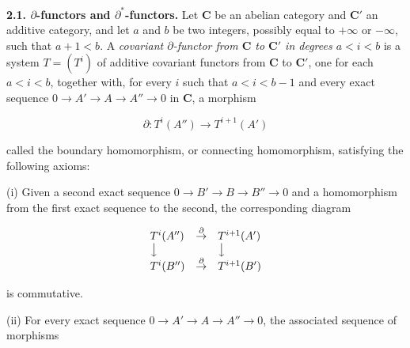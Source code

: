 \textbf{2.1. $\partial$-functors and
$\partial^*$-functors.}
Let $\mathbf{C}$ be an abelian category and $\mathbf{C}'$ an additive category, and let $a$ and
$b$ be two integers, possibly equal to $+\infty$ or $-\infty$, such that
$a+1<b$. A \textit{covariant $\partial$-functor from $\mathbf{C}$ to $\mathbf{C}'$ in degrees
$a<i<b$} is a system $T=(T^i)$ of additive covariant functors from $\mathbf{C}$ to
$\mathbf{C}'$, one for each $a<i<b$, together with, for every $i$ such that
$a<i<b-1$ and every exact sequence
$0\to A'\to A\to A''\to 0$
in $\mathbf{C}$, a morphism

\[
 \partial:T^i(A'')\to T^{i+1}(A')
\]

\noindent called the boundary homomorphism, or connecting homomorphism,
satisfying the following axioms:

 (i) Given a second exact sequence
$0\to B'\to B\to B''\to 0$
and a homomorphism from the first exact sequence to the second, the
corresponding diagram

\[
\begin{array}{lcl}
T^i(A'') & \mathop{\to}\limits^{\partial} & T^{i+1}(A')\\
\big\downarrow && \big\downarrow\\
T^i(B'') & \mathop{\to}\limits^{\partial} & T^{i+1}(B')
\end{array}
\]

\noindent is commutative.

 (ii) For every exact sequence
$0\to A'\to A\to A''\to 0$,
the associated sequence of morphisms

